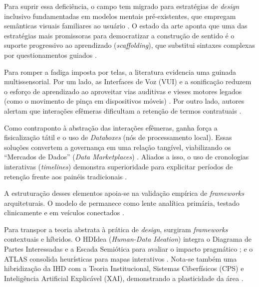 \documentclass[12pt]{article}
\newcommand{\hlcite}[1]{\colorbox{yellow}{\cite{#1}}} %
\begin{document}
{{    Para suprir essa deficiência, o campo tem migrado para estratégias de \textit{design} inclusivo fundamentadas em modelos mentais pré-existentes, que empregam semânticas visuais familiares ao usuário \hlcite{Barreto2018, DeAlmeida2019}. O estado da arte aponta que uma das estratégias mais promissoras para democratizar a construção de sentido é o suporte progressivo ao aprendizado (\textit{scaffolding}), que substitui sintaxes complexas por questionamentos guiados \cite{Trajkova2020}.

    Para romper a fadiga imposta por telas, a literatura evidencia uma guinada multissensorial. Por um lado, as Interfaces de Voz (VUI) e a sonificação reduzem o esforço de aprendizado ao aproveitar vias auditivas e vieses motores legados (como o movimento de pinça em dispositivos móveis) \cite{Sailaja2021, o, Friedman2024}. Por outro lado, autores alertam que interações efêmeras dificultam a retenção de termos contratuais \hlcite{Jones2017, Lockwood2021}. 

    Como contraponto à abstração das interações efêmeras, ganha força a fisicalização tátil e o uso de \textit{Databoxes} (nós de processamento local). Essas soluções convertem a governança em uma relação tangível, viabilizando os ``Mercados de Dados'' (\textit{Data Marketplaces}) \cite{coleti2024humanSillabus, Bowyer2022, Elhamdadi2022, Turkay2021, Crabtree2016}. Aliados a isso, o uso de cronologias interativas (\textit{timelines}) demonstra superioridade para explicitar períodos de retenção frente aos painéis tradicionais \cite{DOWTHWAITE2024, DeAlmeida2019, Coleti2019DesigPatterns, Lockwood2020AnAccessible, Hutton2017, Briggs2021, Chowdhury2016, Mashhadi2014, Barreto2018}.

    A estruturação desses elementos apoia-se na validação empírica de \textit{frameworks} arquiteturais. O modelo de\cite{mortier2015humandatainteractionhumanface} permanece como lente analítica primária, testado clinicamente e em veículos conectados \cite{mortier2015humandatainteractionhumanface, DOWTHWAITE2024, Lenzi2024, Burzio2024, Meechan2023, Victorelli2023Evaluating, Stead2022, Sailaja2021, Lockwood2021, Crabtree2021, Zou2020769, Victorelli2020Human, Locoro2020, Lockwood2020AnAccessible, cezar2023cognitive, sailaja2021exploring}. 

    Para transpor a teoria abstrata à prática de \textit{design}, surgiram \textit{frameworks} contextuais e híbridos. O HDIdea (\textit{Human-Data Ideation}) integra o Diagrama de Partes Interessadas e a Escada Semiótica para avaliar o impacto pragmático \cite{Strey2019Human}; e o ATLAS consolida heurísticas para mapas interativos \cite{Capeleti2024Human}. Nota-se também uma hibridização da IHD com a Teoria Institucional, Sistemas Ciberfísicos (CPS) e Inteligência Artificial Explicável (XAI), demonstrando a plasticidade da área \cite{hayes2024making, Jandric2023, Zou2020769, mu2024institutional, bavaresco2019technological, durango2024data, Yuan20243615, Turkay2021}.

}}
\end{document}
